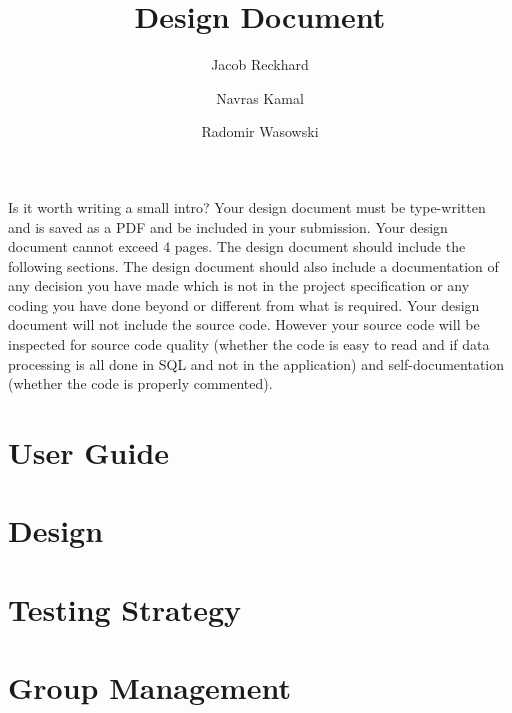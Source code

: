 \documentclass{article}
\title{Design Document}
\author{Jacob Reckhard \and Navras Kamal \and Radomir Wasowski}
\begin{document}
\maketitle

Is it worth writing a small intro? Your design document must be type-written and is saved as a PDF and be included in your submission. Your design document cannot exceed 4 pages. The design document should include the following sections. The design document should also include a documentation of any decision you have made which is not in the project specification or any coding you have done beyond or different from what is required. Your design document will not include the source code. However your source code will be inspected for source code quality (whether the code is easy to read and if data processing is all done in SQL and not in the application) and self-documentation (whether the code is properly commented).

\section{User Guide}


\section{Design}


\section{Testing Strategy}


\section{Group Management}

\end{document}
